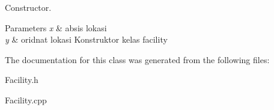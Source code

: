Constructor. 


\begin{DoxyParams}{Parameters}
{\em x} & absis lokasi \\
\hline
{\em y} & oridnat lokasi Konstruktor kelas facility \\
\hline
\end{DoxyParams}


The documentation for this class was generated from the following files\+:\begin{DoxyCompactItemize}
\item 
Facility.\+h\item 
Facility.\+cpp\end{DoxyCompactItemize}
